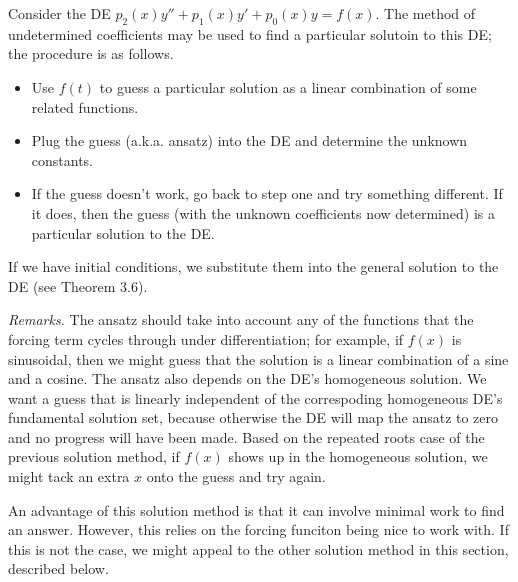 \documentclass[../m82main.tex]{chapters}
\begin{document}
\begin{definition}
    Consider the DE $p_2(x)y'' + p_1(x)y' + p_0(x)y = f(x)$.
    The method of undetermined coefficients may be used to find a particular solutoin to this DE; the procedure is as follows.
    \begin{itemize}
        \item Use $f(t)$ to guess a particular solution as a linear combination of some related functions.
        \item Plug the guess (a.k.a. ansatz) into the DE and determine the unknown constants.
        \item If the guess doesn't work, go back to step one and try something different.
        If it does, then the guess (with the unknown coefficients now determined) is a particular solution to the DE.
    \end{itemize}
    If we have initial conditions, we substitute them into the general solution to the DE (see Theorem 3.6).
\end{definition}

\textit{Remarks.}
The ansatz should take into account any of the functions that the forcing term cycles through under differentiation; for example, if $f(x)$ is sinusoidal, then we might guess that the solution is a linear combination of a sine and a cosine.
The ansatz also depends on the DE's homogeneous solution.
We want a guess that is linearly independent of the correspoding homogeneous DE's fundamental solution set, because otherwise the DE will map the ansatz to zero and no progress will have been made.
Based on the repeated roots case of the previous solution method, if $f(x)$ shows up in the homogeneous solution, we might tack an extra $x$ onto the guess and try again.

An advantage of this solution method is that it can involve minimal work to find an answer.
However, this relies on the forcing funciton being nice to work with.
If this is not the case, we might appeal to the other solution method in this section, described below.
\end{document}
